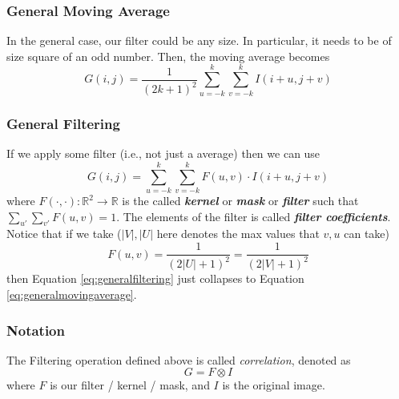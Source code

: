 \documentclass[11pt]{article}
\newcommand{\real}{\mathbb{R}}
\begin{document}
\subsubsection{General Moving Average}
In the general case, our filter could be any size. In particular, it needs to be of size square of an odd number. Then, the moving average becomes
\begin{equation}
	G(i, j)=\frac{1}{(2 k+1)^{2}} \sum_{u=-k}^{k} \sum_{v=-k}^{k} I(i+u, j+v)\label{eq:generalmovingaverage}
\end{equation}
\subsubsection{General Filtering}
If we apply some filter (i.e., not just a average) then we can use
\begin{equation}
	G(i, j)=\sum_{u=-k}^{k} \sum_{v=-k}^{k} F(u, v) \cdot I(i+u, j+v)\label{eq:generalfiltering}
\end{equation}
where $F(\cdot, \cdot): \real^2 \rightarrow \real$ is the called \textit{\textbf{kernel}} or \textit{\textbf{mask}} or \textit{\textbf{filter}} such that $\sum_{u'}\sum_{v'}F(u, v) = 1$. The elements of the filter is called \textit{\textbf{filter coefficients}}. Notice that if we take ($|V|, |U|$ here denotes the max values that $v, u$ can take)
\begin{equation}
	F(u, v) = \frac{1}{(2|U| + 1)^{2}} = \frac{1}{(2|V| + 1)^{2}}
\end{equation}
then Equation \ref{eq:generalfiltering} just collapses to Equation \ref{eq:generalmovingaverage}.
\subsubsection{Notation}
The Filtering operation defined above is called \textit{correlation}, denoted as
\begin{equation}
	G = F\otimes I
\end{equation}
where $F$ is our filter / kernel / mask, and $I$ is the original image. 
\end{document}
